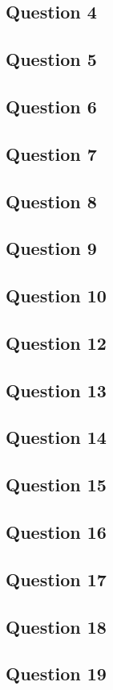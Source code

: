 \documentclass[11pt,a4paper]{article}
\begin{document}
\subsection*{Question 4}

\subsection*{Question 5}

\subsection*{Question 6}

\subsection*{Question 7}

\subsection*{Question 8}

\subsection*{Question 9}

\subsection*{Question 10}

\subsection*{Question 12}

\subsection*{Question 13}

\subsection*{Question 14}

\subsection*{Question 15}

\subsection*{Question 16}

\subsection*{Question 17}

\subsection*{Question 18}

\subsection*{Question 19}
\end{document}
